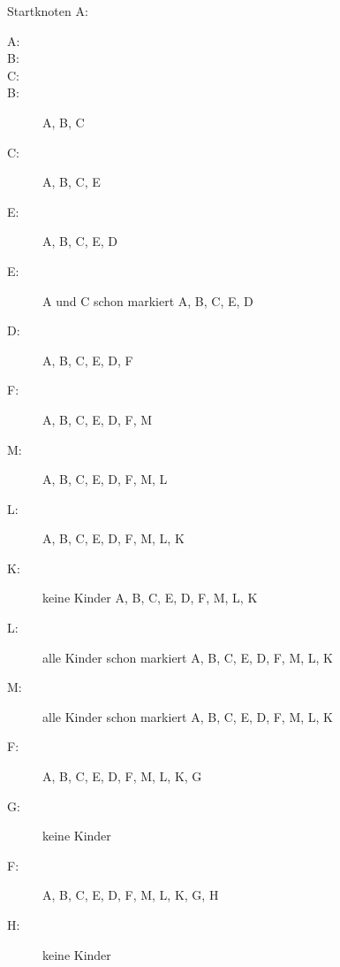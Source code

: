 \documentclass{lehramt-informatik}
\begin{document}
Startknoten A:

\begin{description}

\item[A:]

\item[B:]

\item[C:]

\item[B:]
A, B, C

\item[C:]
A, B, C, E

\item[E:]
A, B, C, E, D

\item[E:]
A und C schon
markiert
A, B, C, E, D

\item[D:]
A, B, C, E, D, F

\item[F:]
A, B, C, E, D, F, M

\item[M:]
A, B, C, E, D, F, M, L

\item[L:]
A, B, C, E, D, F, M, L, K

\item[K:] keine Kinder
A, B, C, E, D, F, M, L, K

\item[L:] alle Kinder schon markiert
A, B, C, E, D, F, M, L, K

\item[M:] alle Kinder schon markiert
A, B, C, E, D, F, M, L, K

\item[F:]
A, B, C, E, D, F, M, L, K, G

\item[G:] keine Kinder

\item[F:]
A, B, C, E, D, F, M, L, K, G, H

\item[H:] keine Kinder


\end{description}
\end{document}
